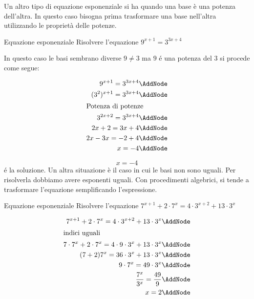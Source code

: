 Un altro tipo di equazione esponenziale si ha quando una base è una potenza dell'altra. In questo caso bisogna prima trasformare una base nell'altra utilizzando le proprietà delle potenze.
\begin{esempiot}{Equazione esponenziale}{}
	Risolvere l'equazione $9^{x+1}=3^{3x+4}$
\end{esempiot}\newpage In questo caso le basi sembrano diverse $9\neq 3$ ma $9$ \'{e} una potenza del $3$ si procede come segue:
	\begin{NodesList}%
		\begin{align*}
			9^{x+1}=3^{3x+4}\AddNode\\
			(3^2)^{x+1}=3^{3x+4}\AddNode\\
			\intertext{\hfil Potenza di potenze}
			3^{2x+2}=3^{3x+4}\AddNode\\
			2x+2=3x+4\AddNode\\
			2x-3x=-2+4\AddNode\\
			x=-4\AddNode
		\end{align*}
		\LinkNodes{}%
	\end{NodesList}
	\[x=-4\]
	\'{e} la soluzione.
Un altra situazione è il caso in cui le basi non sono uguali. Per risolverla dobbiamo avere esponenti uguali. Con procedimenti algebrici, si tende a trasformare l'equazione semplificando l'espressione. 
\begin{esempiot}{Equazione esponenziale}{}
	Risolvere l'equazione $7^{x+1}+2\cdot7^{x}=4\cdot3^{x+2}+13\cdot 3^x$
\end{esempiot}
	\begin{NodesList}%
		\begin{align*}
			7^{x+1}+2\cdot7^{x}=4\cdot3^{x+2}+13\cdot 3^x\AddNode\\
			\intertext{\hfil indici uguali}
			7\cdot7^x+2\cdot7^x=4\cdot9\cdot3^x+13\cdot3^x\AddNode\\
			(7+2)7^x=36\cdot3^x+13\cdot3^x\AddNode\\
			9\cdot7^x=49\cdot3^x\AddNode\\
			\dfrac{7^x}{3^x}=\dfrac{49}{9}\AddNode\\
			x=2\AddNode
		\end{align*}
	\end{NodesList}
